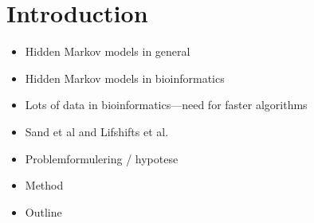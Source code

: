 \chapter{Introduction}

\begin{itemize}
\item Hidden Markov models in general
\item Hidden Markov models in bioinformatics
\item Lots of data in bioinformatics---need for faster algorithms
\item Sand et al and Lifshifts et al.
\item Problemformulering / hypotese
\item Method
\item Outline
\end{itemize}

